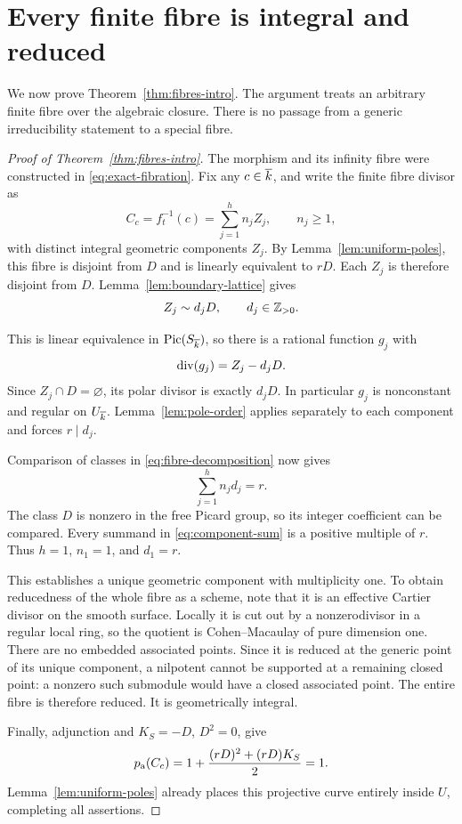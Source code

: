 \section{Every finite fibre is integral and reduced}\label{sec:fibres}

We now prove Theorem~\ref{thm:fibres-intro}. The argument treats an
arbitrary finite fibre over the algebraic closure. There is no passage
from a generic irreducibility statement to a special fibre.

\begin{proof}[Proof of Theorem~\ref{thm:fibres-intro}]
The morphism and its infinity fibre were constructed in
\eqref{eq:exact-fibration}. Fix any \(c\in\overline{k}\), and write
the finite fibre divisor as
\begin{equation}\label{eq:fibre-decomposition}
C_c=f_t^{-1}(c)=\sum_{j=1}^{h}n_jZ_j,\qquad n_j\ge1,
\end{equation}
with distinct integral geometric components \(Z_j\).
By Lemma~\ref{lem:uniform-poles}, this fibre is disjoint from \(D\)
and is linearly equivalent to \(rD\). Each \(Z_j\) is
therefore disjoint from \(D\). Lemma~\ref{lem:boundary-lattice}
gives
\[
Z_j\sim d_jD,\qquad d_j\in\mathbb Z_{>0}.
\]

This is linear equivalence in \(\operatorname{Pic}(S_{\overline{k}})\), so there
is a rational function \(g_j\) with
\[
\operatorname{div}(g_j)=Z_j-d_jD.
\]
Since \(Z_j\cap D=\varnothing\), its polar divisor is exactly
\(d_jD\). In particular \(g_j\) is nonconstant and regular on
\(U_{\overline{k}}\). Lemma~\ref{lem:pole-order} applies separately
to each component and forces \(r\mid d_j\).

Comparison of classes in \eqref{eq:fibre-decomposition} now gives
\begin{equation}\label{eq:component-sum}
\sum_{j=1}^{h}n_jd_j=r.
\end{equation}
The class \(D\) is nonzero in the free Picard group, so its
integer coefficient can be compared. Every summand in
\eqref{eq:component-sum} is a positive multiple of \(r\).
Thus \(h=1\), \(n_1=1\), and \(d_1=r\).

This establishes a unique geometric component with multiplicity one.
To obtain reducedness of the whole fibre as a scheme, note that it is
an effective Cartier divisor on the smooth surface. Locally it is
cut out by a nonzerodivisor in a regular local ring, so the quotient
is Cohen--Macaulay of pure dimension one. There are no embedded
associated points. Since it is reduced at the generic point of its
unique component, a nilpotent cannot be supported at a remaining
closed point: a nonzero such submodule would have a closed associated
point. The entire fibre is therefore reduced. It is geometrically
integral.

Finally, adjunction and \(K_S=-D\), \(D^2=0\), give
\begin{equation}\label{eq:fibre-genus}
p_{\mathrm a}(C_c)=1+\frac{(rD)^2+(rD)K_S}{2}=1.
\end{equation}
Lemma~\ref{lem:uniform-poles} already places this projective curve
entirely inside \(U\), completing all assertions.
\end{proof}

